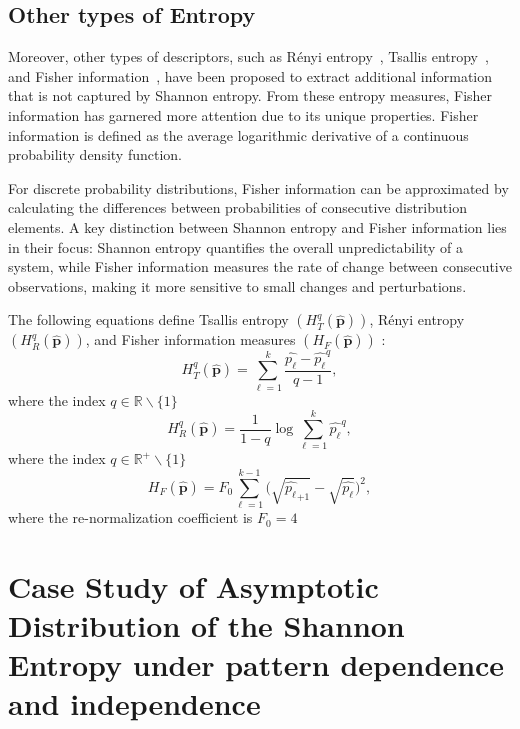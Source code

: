 \subsection{Other types of Entropy}

Moreover, other types of descriptors, such as Rényi entropy~\cite{renyi1961measures}, Tsallis entropy~\cite{tsallis1988possible}, and Fisher information~\cite{frieden2004science}, have been proposed to extract additional information that is not captured by Shannon entropy.
From these entropy measures, Fisher information has garnered more attention due to its unique properties. Fisher information is defined as the average logarithmic derivative of a continuous probability density function.

For discrete probability distributions, Fisher information can be approximated by calculating the differences between probabilities of consecutive distribution elements. A key distinction between Shannon entropy and Fisher information lies in their focus: Shannon entropy quantifies the overall unpredictability of a system, while Fisher information measures the rate of change between consecutive observations, making it more sensitive to small changes and perturbations.

The following equations define Tsallis entropy $	(H_{T}^{q}(\widehat{\mathbf{p}}))$, Rényi entropy $(H_{R}^{q}(\widehat{\mathbf{p}}))$, and Fisher information measures $(H_{F}(\widehat{\mathbf{p}}))$ \cite{sanchez2009discrete} :
\begin{equation}
	H_{T}^{q}(\widehat{\mathbf{p}})=\sum_{\ell=1}^{k}\dfrac{\widehat{p_\ell}-\widehat{p_\ell}^q}{q-1},
\end{equation}
where the index $q\in \mathbb{R}\backslash \{1\}$
\begin{equation}
	H_{R}^{q}(\widehat{\mathbf{p}})=\dfrac{1}{1-q} \log \sum_{\ell=1}^{k}{\widehat{p_\ell}}^q,
\end{equation}
where the index $q\in \mathbb{R}^{+}\backslash \{1\}$
\begin{equation}
	H_F(\widehat{\mathbf{p}})=F_0\sum_{\ell=1}^{k-1}\Big(\sqrt{\widehat{p_\ell}_{+1}}-\sqrt{\widehat{p_\ell}}\Big)^2 ,
\end{equation}
where the re-normalization coefficient is $F_0=4$ \cite{sanchez2009discrete}

\section{Case Study of Asymptotic Distribution of the Shannon Entropy under pattern dependence and independence} \label{Sec:CaseStudy} 


